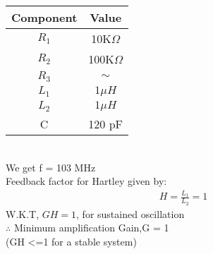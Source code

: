 \begin{enumerate}[label=\thesection.\arabic*.,ref=\thesection.\theenumi]
\begin{tabular}{|c|c|}
\hline
Component & Value  \\
\hline
$R_1$         & 10K$\Omega$   \\
\hline
$R_2$         & 100K$\Omega$   \\
\hline
$R_3$         & $\sim$  \\
\hline
$L_1$         & $1 \mu H$     \\
\hline
$L_2$         & $1 \mu H$   \\
\hline
C         & 120 pF \\
\hline
\end{tabular}
\\

We get f = 103 MHz\\
Feedback factor for Hartley given by:
\begin{align}
H =\frac{L_1}{L_2}= 1
\end{align}
W.K.T, $GH = 1$, for sustained oscillation \\
$\therefore$ Minimum amplification Gain,G = 1\\ (GH <=1 for a stable system) \\
\end{enumerate}
